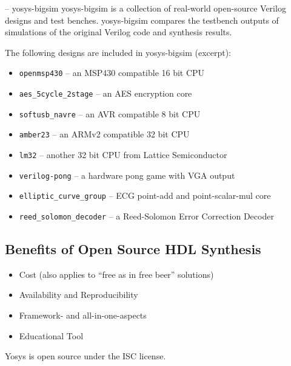 \begin{frame}{\subsecname{} -- yosys-bigsim}
yosys-bigsim is a collection of real-world open-source Verilog designs and test
benches. yosys-bigsim compares the testbench outputs of simulations of the original
Verilog code and synthesis results.

\bigskip
The following designs are included in yosys-bigsim (excerpt):
\begin{itemize}
\item {\tt openmsp430} -- an MSP430 compatible 16 bit CPU
\item {\tt aes\_5cycle\_2stage} -- an AES encryption core
\item {\tt softusb\_navre} -- an AVR compatible 8 bit CPU
\item {\tt amber23} -- an ARMv2 compatible 32 bit CPU
\item {\tt lm32} -- another 32 bit CPU from Lattice Semiconductor
\item {\tt verilog-pong} -- a hardware pong game with VGA output
\item {\tt elliptic\_curve\_group} -- ECG point-add and point-scalar-mul core
\item {\tt reed\_solomon\_decoder} -- a Reed-Solomon Error Correction Decoder
\end{itemize}
\end{frame}


\subsection{Benefits of Open Source HDL Synthesis}

\begin{frame}{\subsecname}
\begin{itemize}
\item Cost (also applies to ``free as in free beer'' solutions)
\item Availability and Reproducibility
\item Framework- and all-in-one-aspects
\item Educational Tool
\end{itemize}

\bigskip

Yosys is open source under the ISC license.
\end{frame}

